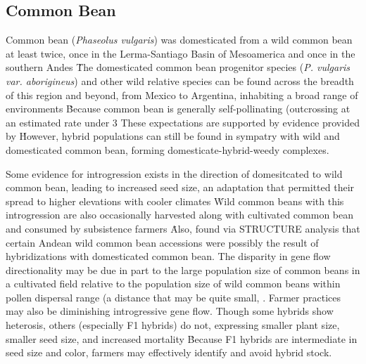 \documentclass[11pt]{article}
\begin{document}
\subsection*{Common Bean}

Common bean (\emph{Phaseolus vulgaris}) was domesticated from a wild common bean at least twice, once in the Lerma-Santiago Basin of Mesoamerica and once in the southern Andes \cite{kwak2009putative}\.
The domesticated common bean progenitor species (\emph{P. vulgaris var. aborigineus}) and other wild relative species can be found across the breadth of this region and beyond, from Mexico to Argentina, inhabiting a broad range of environments \cite{debouck1988implications, CWR}\.
Because common bean is generally self-pollinating (outcrossing at an estimated rate under 3%
These expectations are supported by evidence provided by \cite{papa2003asymmetry}\.
However, hybrid populations can still be found in sympatry with wild and domesticated common bean, forming domesticate-hybrid-weedy complexes.

Some evidence for introgression exists in the direction of domesitcated to wild common bean, leading to increased seed size, an adaptation that permitted their spread to higher elevations with cooler climates \cite{debouck1993genetic}\.
Wild common beans with this introgression are also occasionally harvested along with cultivated common bean and consumed by subsistence farmers \cite{papa2003asymmetry}\.
Also, \cite{kwak2009structure} found via STRUCTURE analysis that certain Andean wild common bean accessions were possibly the result of hybridizations with domesticated common bean.
The disparity in gene flow directionality may be due in part to the large population size of common beans in a cultivated field relative to the population size of wild common beans within pollen dispersal range (a distance that may be quite small, \cite{papa2003asymmetry}.
Farmer practices may also be diminishing introgressive gene flow.
Though some hybrids show heterosis, others (especially F1 hybrids) do not, expressing smaller plant size, smaller seed size, and increased mortality \cite{gutierrez1985heterosis, paredes1995extensive}\.
Because F1 hybrids are intermediate in seed size and color, farmers may effectively identify and avoid hybrid stock.
\end{document}
